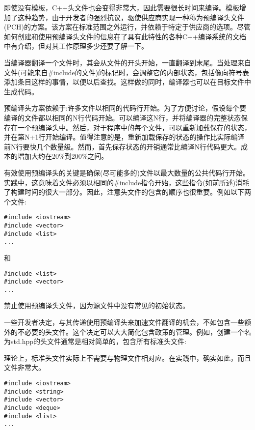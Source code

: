 
即使没有模板，C++头文件也会变得非常大，因此需要很长时间来编译。模板增加了这种趋势，由于开发者的强烈抗议，驱使供应商实现一种称为预编译头文件(PCH)的方案。该方案在标准范围之外运行，并依赖于特定于供应商的选项。尽管如何创建和使用预编译头文件的信息在了具有此特性的各种C++编译系统的文档中有介绍，但对其工作原理多少还要了解一下。

当编译器翻译一个文件时，其会从文件的开头开始，一直翻译到末尾。当处理来自文件(可能来自\#include的文件)的标记时，会调整它的内部状态，包括像向符号表添加条目这样的事情，以便以后查找。这样做的同时，编译器也可以在目标文件中生成代码。

预编译头方案依赖于:许多文件以相同的代码行开始。为了方便讨论，假设每个要编译的文件都以相同的N行代码开始。可以编译这N行，并将编译器的完整状态保存在一个预编译头中。然后，对于程序中的每个文件，可以重新加载保存的状态，并在第N+1行开始编译。值得注意的是，重新加载保存的状态的操作比实际编译前N行要快几个数量级。然而，首先保存状态的开销通常比编译N行代码更大。成本的增加大约在20\%到200\%之间。 

有效使用预编译头的关键是确保(尽可能多的)文件以最大数量的公共代码行开始。实践中，这意味着文件必须以相同的\#include指令开始，这些指令(如前所述)消耗了构建时间的很大一部分。因此，注意头文件的包含的顺序也很重要。例如以下两个文件:

\begin{lstlisting}[style=styleCXX]
#include <iostream>
#include <vector>
#include <list>
...
\end{lstlisting}

和

\begin{lstlisting}[style=styleCXX]
#include <list>
#include <vector>
...
\end{lstlisting}

禁止使用预编译头文件，因为源文件中没有常见的初始状态。

一些开发者决定，与其传递使用预编译头来加速文件翻译的机会，不如包含一些额外的不必要的头文件。这个决定可以大大简化包含政策的管理。例如，创建一个名为std.hpp的头文件通常是相对简单的，包含所有标准头文件:

\begin{tcolorbox}[colback=webgreen!5!white,colframe=webgreen!75!black]
\hspace*{0.75cm}理论上，标准头文件实际上不需要与物理文件相对应。在实践中，确实如此，而且文件非常大。
\end{tcolorbox}

\begin{lstlisting}[style=styleCXX]
#include <iostream>
#include <string>
#include <vector>
#include <deque>
#include <list>
...
\end{lstlisting}

